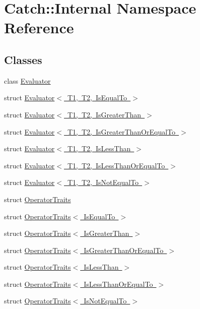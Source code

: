 \hypertarget{namespace_catch_1_1_internal}{}\section{Catch\+:\+:Internal Namespace Reference}
\label{namespace_catch_1_1_internal}
\subsection*{Classes}
\begin{DoxyCompactItemize}
\item 
class \mbox{\hyperlink{class_catch_1_1_internal_1_1_evaluator}{Evaluator}}
\item 
struct \mbox{\hyperlink{struct_catch_1_1_internal_1_1_evaluator_3_01_t1_00_01_t2_00_01_is_equal_to_01_4}{Evaluator$<$ T1, T2, Is\+Equal\+To $>$}}
\item 
struct \mbox{\hyperlink{struct_catch_1_1_internal_1_1_evaluator_3_01_t1_00_01_t2_00_01_is_greater_than_01_4}{Evaluator$<$ T1, T2, Is\+Greater\+Than $>$}}
\item 
struct \mbox{\hyperlink{struct_catch_1_1_internal_1_1_evaluator_3_01_t1_00_01_t2_00_01_is_greater_than_or_equal_to_01_4}{Evaluator$<$ T1, T2, Is\+Greater\+Than\+Or\+Equal\+To $>$}}
\item 
struct \mbox{\hyperlink{struct_catch_1_1_internal_1_1_evaluator_3_01_t1_00_01_t2_00_01_is_less_than_01_4}{Evaluator$<$ T1, T2, Is\+Less\+Than $>$}}
\item 
struct \mbox{\hyperlink{struct_catch_1_1_internal_1_1_evaluator_3_01_t1_00_01_t2_00_01_is_less_than_or_equal_to_01_4}{Evaluator$<$ T1, T2, Is\+Less\+Than\+Or\+Equal\+To $>$}}
\item 
struct \mbox{\hyperlink{struct_catch_1_1_internal_1_1_evaluator_3_01_t1_00_01_t2_00_01_is_not_equal_to_01_4}{Evaluator$<$ T1, T2, Is\+Not\+Equal\+To $>$}}
\item 
struct \mbox{\hyperlink{struct_catch_1_1_internal_1_1_operator_traits}{Operator\+Traits}}
\item 
struct \mbox{\hyperlink{struct_catch_1_1_internal_1_1_operator_traits_3_01_is_equal_to_01_4}{Operator\+Traits$<$ Is\+Equal\+To $>$}}
\item 
struct \mbox{\hyperlink{struct_catch_1_1_internal_1_1_operator_traits_3_01_is_greater_than_01_4}{Operator\+Traits$<$ Is\+Greater\+Than $>$}}
\item 
struct \mbox{\hyperlink{struct_catch_1_1_internal_1_1_operator_traits_3_01_is_greater_than_or_equal_to_01_4}{Operator\+Traits$<$ Is\+Greater\+Than\+Or\+Equal\+To $>$}}
\item 
struct \mbox{\hyperlink{struct_catch_1_1_internal_1_1_operator_traits_3_01_is_less_than_01_4}{Operator\+Traits$<$ Is\+Less\+Than $>$}}
\item 
struct \mbox{\hyperlink{struct_catch_1_1_internal_1_1_operator_traits_3_01_is_less_than_or_equal_to_01_4}{Operator\+Traits$<$ Is\+Less\+Than\+Or\+Equal\+To $>$}}
\item 
struct \mbox{\hyperlink{struct_catch_1_1_internal_1_1_operator_traits_3_01_is_not_equal_to_01_4}{Operator\+Traits$<$ Is\+Not\+Equal\+To $>$}}
\end{DoxyCompactItemize}
